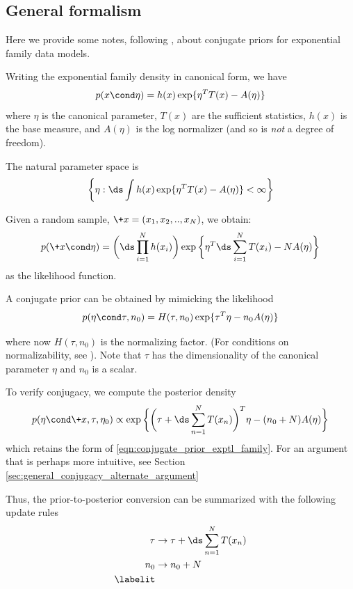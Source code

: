 \documentclass{article} %
\begin{document}
\subsection{General formalism} \label{sec:ef_general_formalism}

Here we provide some notes, following \cite{jordan_ef}, about conjugate priors for exponential family data models. 

Writing the exponential family density in canonical form, we have
\[ p(x \cond \eta) = h(x) \exp \{ \eta^T T(x) - A(\eta) \} \]
where $\eta$ is the canonical parameter, $T(x)$ are the sufficient statistics,  $h(x)$ is the base measure, and $A(\eta)$ is the log normalizer (and so is \textit{not} a degree of freedom). 

The natural parameter space is 
\[  \bigg\{\eta : \ds\int h(x) \exp \{ \eta^T T(x) - A(\eta) \} < \infty \bigg \}\]

Given a random sample, $\+x=(x_1, x_2, .., x_N)$, we obtain:
\[ p(\+x \cond \eta) = \bigg( \ds\prod_{i=1}^N h(x_i)  \bigg) \exp \bigg\{ \eta^T  \ds\sum_{i=1}^N T(x_i) - N A(\eta) \bigg\} \]
as the likelihood function.

A conjugate prior can be obtained by mimicking the likelihood
\begin{equation}
p (\eta \cond \tau, n_0) = H(\tau, n_0) \exp \{ \tau^T \eta - n_0 A(\eta)\}
\label{eqn:conjugate_prior_exptl_family}
\end{equation}

where now $H(\tau, n_0)$ is the normalizing factor.  (For conditions on normalizability, see \cite{jordan_ef}).   Note that $\tau$ has the dimensionality of the canonical parameter $\eta$ and $n_0$ is a scalar.

To verify conjugacy, we compute the posterior density
\[ p (\eta \cond \+x, \tau, \eta_0)  \propto \exp \bigg\{ \bigg( \tau + \ds\sum_{n=1}^N  T(x_n) \bigg)^T \eta - (n_0 + N) A(\eta) \bigg\} \]
which retains the form of \eqref{eqn:conjugate_prior_exptl_family}.  For an argument that is perhaps more intuitive, see Section \ref{sec:general_conjugacy_alternate_argument} 

Thus, the prior-to-posterior conversion can be summarized with the following update rules
\begin{align*}
\tau & \to \tau + \ds\sum_{n=1}^N T(x_n) \\
n_0 & \to  n_0 + N \\
\labelit \label{eqn:general_formalism_prior_to_posterior_conversion}
\end{align*}
\end{document}

